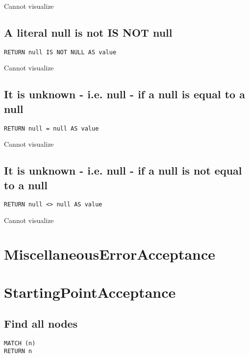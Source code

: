 Cannot visualize
\subsection{A literal null is not IS NOT null}

\begin{lstlisting}
RETURN null IS NOT NULL AS value
\end{lstlisting}

Cannot visualize
\subsection{It is unknown - i.e. null - if a null is equal to a null}

\begin{lstlisting}
RETURN null = null AS value
\end{lstlisting}

Cannot visualize
\subsection{It is unknown - i.e. null - if a null is not equal to a null}

\begin{lstlisting}
RETURN null <> null AS value
\end{lstlisting}

Cannot visualize
\section{MiscellaneousErrorAcceptance}

\section{StartingPointAcceptance}

\subsection{Find all nodes}

\begin{lstlisting}
MATCH (n)
RETURN n
\end{lstlisting}

